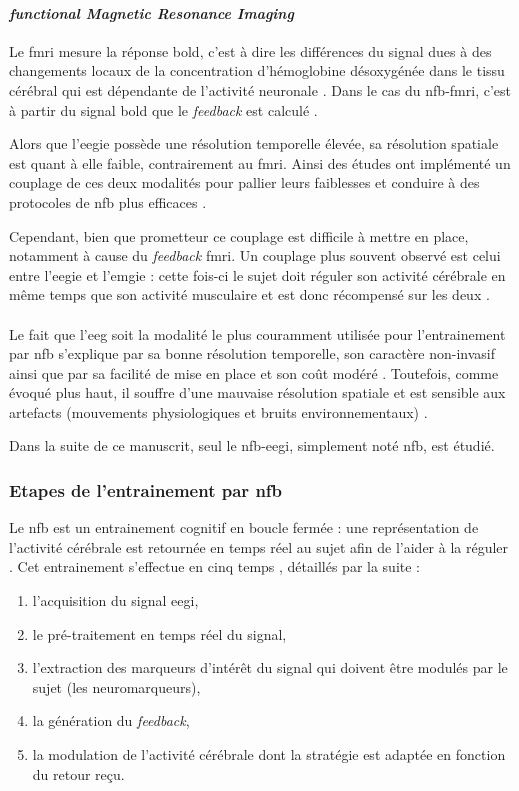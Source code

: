 \paragraph{\textit{functional Magnetic Resonance Imaging}} 
Le \gls{fmri} mesure la réponse \gls{bold}, c'est à dire les différences du signal dues à des changements locaux de la concentration d'hémoglobine désoxygénée 
dans le tissu cérébral qui est dépendante de l'activité neuronale \citep{Dewiputri2013}. Dans le cas du \gls{nfb}-\gls{fmri}, c'est à partir du signal 
\gls{bold} que le \textit{feedback} est calculé \citep{Dewiputri2013}. 

Alors que l'\gls{eegie} possède une résolution temporelle élevée, sa résolution spatiale est quant à elle faible, 
contrairement au \gls{fmri}. Ainsi des études ont implémenté un couplage de ces deux modalités pour pallier leurs faiblesses et conduire à des 
protocoles de \gls{nfb} plus efficaces \citep{Perronnet2017}. 

Cependant, bien que prometteur ce couplage est difficile à mettre en place, notamment à cause du \textit{feedback} \gls{fmri}.
Un couplage plus souvent observé est celui entre l'\gls{eegie} et l'\gls{emgie} : cette fois-ci le sujet doit réguler son activité cérébrale en même temps que son
activité musculaire et est donc récompensé sur les deux \citep{Bink2014}. \\
\\
\indent Le fait que l'\gls{eeg} soit la modalité le plus couramment utilisée pour l'entrainement par \gls{nfb} s'explique par sa bonne résolution temporelle, son caractère non-invasif
ainsi que par sa facilité de mise en place et son coût modéré \citep{Fovet2016}. Toutefois, comme évoqué plus haut, il souffre d'une mauvaise résolution 
spatiale et est sensible aux artefacts (mouvements physiologiques et bruits environnementaux) \citep{Iwasaki2005, Goncharova2003}. 

Dans la suite de ce manuscrit, seul le \gls{nfb}-\gls{eegi}, simplement noté \gls{nfb}, est étudié. 

\subsubsection{Etapes de l'entrainement par \gls{nfb}} \label{steps_NFB_taining}

Le \gls{nfb} est un entrainement cognitif en boucle fermée : une représentation de l'activité cérébrale est retournée en temps réel
au sujet afin de l'aider à la réguler \citep{Enriquez2017}. Cet entrainement s'effectue en cinq temps \citep{Enriquez2017}, détaillés
par la suite :
\begin{enumerate}
\item l'acquisition du signal \gls{eegi}, 
\item le pré-traitement en temps réel du signal,
\item l'extraction des marqueurs d'intérêt du signal qui doivent être modulés par le sujet (les neuromarqueurs),
\item la génération du \textit{feedback},
\item la modulation de l'activité cérébrale dont la stratégie est adaptée en fonction du retour reçu. 
\end{enumerate}

